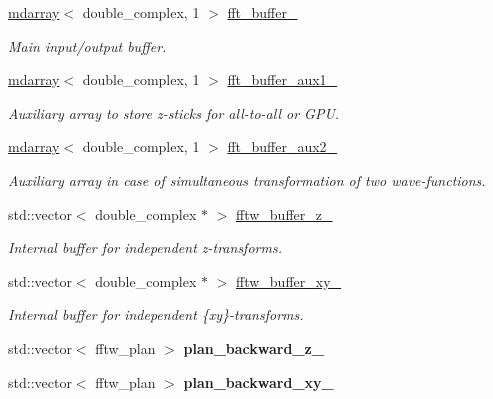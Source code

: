 \begin{DoxyCompactItemize}
\hyperlink{classsddk_1_1mdarray}{mdarray}$<$ double\+\_\+complex, 1 $>$ \hyperlink{classsddk_1_1_f_f_t3_d_a6483ea5038aceb6cd74c9ca94a37eaac}{fft\+\_\+buffer\+\_\+}
\begin{DoxyCompactList}\small\item\em Main input/output buffer. \end{DoxyCompactList}\item 
\hyperlink{classsddk_1_1mdarray}{mdarray}$<$ double\+\_\+complex, 1 $>$ \hyperlink{classsddk_1_1_f_f_t3_d_af73e16ad5cfd2ee76bcc013ee2f26f90}{fft\+\_\+buffer\+\_\+aux1\+\_\+}
\begin{DoxyCompactList}\small\item\em Auxiliary array to store z-\/sticks for all-\/to-\/all or G\+P\+U. \end{DoxyCompactList}\item 
\hyperlink{classsddk_1_1mdarray}{mdarray}$<$ double\+\_\+complex, 1 $>$ \hyperlink{classsddk_1_1_f_f_t3_d_a4a96ae513eb919b71eb42ca74be980cb}{fft\+\_\+buffer\+\_\+aux2\+\_\+}
\begin{DoxyCompactList}\small\item\em Auxiliary array in case of simultaneous transformation of two wave-\/functions. \end{DoxyCompactList}\item 
std\+::vector$<$ double\+\_\+complex $\ast$ $>$ \hyperlink{classsddk_1_1_f_f_t3_d_a9f1235d01cc4e2e2f0f4dd2af50644bb}{fftw\+\_\+buffer\+\_\+z\+\_\+}
\begin{DoxyCompactList}\small\item\em Internal buffer for independent z-\/transforms. \end{DoxyCompactList}\item 
std\+::vector$<$ double\+\_\+complex $\ast$ $>$ \hyperlink{classsddk_1_1_f_f_t3_d_abd9baeb5d472ee92e8f08f95587a257a}{fftw\+\_\+buffer\+\_\+xy\+\_\+}
\begin{DoxyCompactList}\small\item\em Internal buffer for independent \{xy\}-\/transforms. \end{DoxyCompactList}\item 
\hypertarget{classsddk_1_1_f_f_t3_d_a5911f28fbb7f73686d26b19f4887db19}{}std\+::vector$<$ fftw\+\_\+plan $>$ {\bfseries plan\+\_\+backward\+\_\+z\+\_\+}\label{classsddk_1_1_f_f_t3_d_a5911f28fbb7f73686d26b19f4887db19}

\item 
\hypertarget{classsddk_1_1_f_f_t3_d_a24a8f36715a5cb611317e64308f22334}{}std\+::vector$<$ fftw\+\_\+plan $>$ {\bfseries plan\+\_\+backward\+\_\+xy\+\_\+}\label{classsddk_1_1_f_f_t3_d_a24a8f36715a5cb611317e64308f22334}


\end{DoxyCompactItemize}
